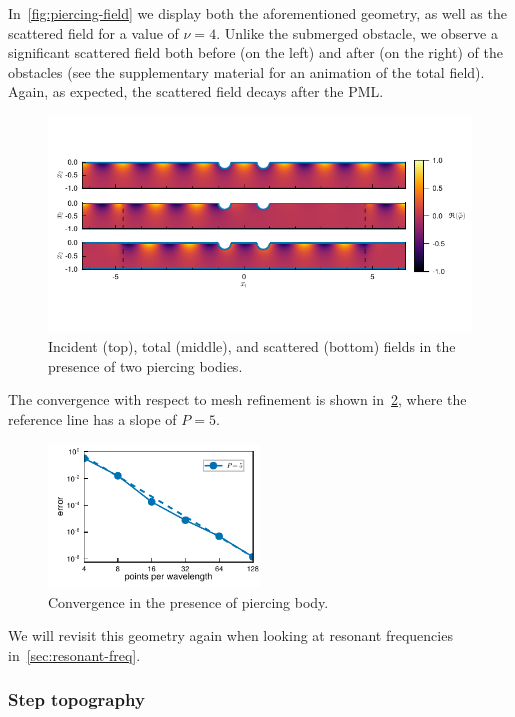 \documentclass[review,hidelinks,onefignum,onetabnum]{siamart220329}
\begin{document}
In~\cref{fig:piercing-field} we display both the aforementioned geometry, as well as the scattered field for a value of $\nu=4$. Unlike the submerged obstacle, we observe a significant scattered field both before (on the left) and after (on the right) of the obstacles (see the supplementary material for an animation of the total field). Again, as expected, the scattered field decays after the PML. 
%
\begin{figure}
  \centering
  \vspace{-50pt}
  \includegraphics[width=1\textwidth]{double_piercing_fields.pdf}
  \vspace{-50pt}
  \caption{Incident (top), total (middle), and scattered (bottom) fields in the presence of two piercing bodies.}
  \label{fig:piercing-fields}
\end{figure}
%
The convergence with respect to mesh refinement is shown in~\cref{fig:piercing-convergence}, where the reference line has a slope of $P=5$. 
\begin{figure}
  \centering
  \includegraphics[width=0.5\textwidth]{mesh_convergence_double_piercing.pdf}
  \caption{Convergence in the presence of piercing body.}
  \label{fig:piercing-convergence}
\end{figure}

We will revisit this geometry again when looking at resonant frequencies in~\cref{sec:resonant-freq}. 

\subsubsection{Step topography}
\end{document}
